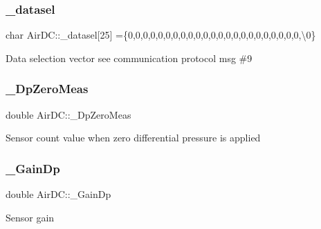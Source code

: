 \subsubsection{\texorpdfstring{\+\_\+datasel}{\_datasel}}
{\footnotesize\ttfamily char Air\+D\+C\+::\+\_\+datasel\mbox{[}25\mbox{]} =\{\textquotesingle{}0\textquotesingle{},\textquotesingle{}0\textquotesingle{},\textquotesingle{}0\textquotesingle{},\textquotesingle{}0\textquotesingle{},\textquotesingle{}0\textquotesingle{},\textquotesingle{}0\textquotesingle{},\textquotesingle{}0\textquotesingle{},\textquotesingle{}0\textquotesingle{},\textquotesingle{}0\textquotesingle{},\textquotesingle{}0\textquotesingle{},\textquotesingle{}0\textquotesingle{},\textquotesingle{}0\textquotesingle{},\textquotesingle{}0\textquotesingle{},\textquotesingle{}0\textquotesingle{},\textquotesingle{}0\textquotesingle{},\textquotesingle{}0\textquotesingle{},\textquotesingle{}0\textquotesingle{},\textquotesingle{}0\textquotesingle{},\textquotesingle{}0\textquotesingle{},\textquotesingle{}0\textquotesingle{},\textquotesingle{}0\textquotesingle{},\textquotesingle{}0\textquotesingle{},\textquotesingle{}0\textquotesingle{},\textquotesingle{}\textbackslash{}0\textquotesingle{}\}}

Data selection vector see communication protocol msg \#9 \mbox{\label{class_air_d_c_a5bef6873f02bb7ef89da730e2ce25126}} 
\subsubsection{\texorpdfstring{\+\_\+\+Dp\+Zero\+Meas}{\_DpZeroMeas}}
{\footnotesize\ttfamily double Air\+D\+C\+::\+\_\+\+Dp\+Zero\+Meas}

Sensor count value when zero differential pressure is applied \mbox{\label{class_air_d_c_aea00f62b7477ab0270c88b04205b8212}} 
\subsubsection{\texorpdfstring{\+\_\+\+Gain\+Dp}{\_GainDp}}
{\footnotesize\ttfamily double Air\+D\+C\+::\+\_\+\+Gain\+Dp}

Sensor gain \mbox{\label{class_air_d_c_a66fa186559440d1b4ae7a1d03bc1d6a5}} 
